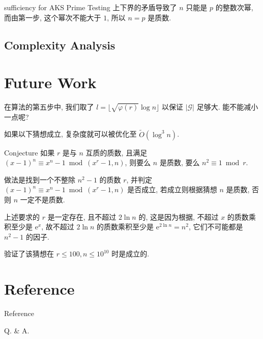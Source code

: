 \documentclass{beamer}
\def\le{\leqslant}
\begin{document}
\begin{frame}{sufficiency for AKS Prime Testing}
	上下界的矛盾导致了 $n$ 只能是 $p$ 的整数次幂, 而由第一步, 这个幂次不能大于 $1$, 所以 $n = p$ 是质数.
\end{frame}
\subsection{Complexity Analysis}
\section{Future Work}
\begin{frame}{}
	在算法的第五步中, 我们取了 $l = \lfloor \sqrt{\varphi(r)}\log n \rfloor$ 以保证 $|\mathcal G|$ 足够大. 能不能减小一点呢?

	如果以下猜想成立, 复杂度就可以被优化至 $\tilde O(\log^3n)$.

	\begin{block}{Conjecture}
		如果 $r$ 是与 $n$ 互质的质数, 且满足 $(x - 1)^n \equiv x^n - 1 \bmod (x^r-1, n)$, 则要么 $n$ 是质数, 要么 $n^2 \equiv 1 \bmod r$.
	\end{block}

	做法是找到一个不整除 $n^2 - 1$ 的质数 $r$, 并判定 $(x - 1)^n \equiv x^n - 1 \bmod (x^r-1, n)$ 是否成立, 若成立则根据猜想 $n$ 是质数, 否则 $n$ 一定不是质数.

	上述要求的 $r$ 是一定存在, 且不超过 $2\ln n$ 的, 这是因为根据\cite{APO}, 不超过 $x$ 的质数乘积至少是 $\mathrm{e}^x$, 故不超过 $2 \ln n$ 的质数乘积至少是 $\mathrm{e}^{2 \ln n} = n^2$, 它们不可能都是 $n^2 - 1$ 的因子.

	\cite{KS} 验证了该猜想在 $r \le 100, n \le 10^{10}$ 时是成立的.
\end{frame}

\section{Reference}
\begin{frame}[allowframebreaks]{Reference}
	
	
\end{frame}
\begin{frame}
	Q. \& A.
\end{frame}	
\end{document}
